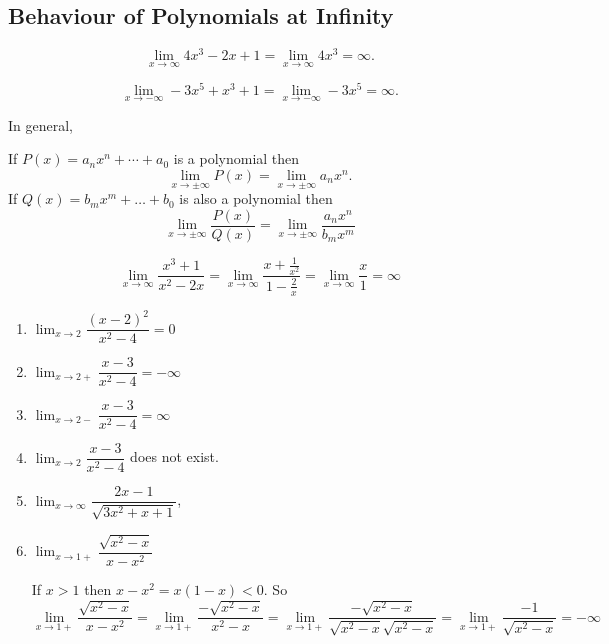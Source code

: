 \documentclass[../calc1-main.tex]{subfiles}
\begin{document}
  \subsection*{Behaviour of Polynomials at Infinity}
  \begin{example}
    \[
      \lim_{x \to \infty} 4x^3 - 2x + 1 =
      \lim_{x \to \infty} 4x^3 = \infty.
    \]

    \[
      \lim_{x \to -\infty} -3x^5 + x^3 +1 =
      \lim_{x \to -\infty} -3 x^5 = \infty.
    \]
  \end{example}
  In general,
  \begin{theorem}
    If $P(x) = a_n x^n + \cdots + a_0$ is a polynomial then
    \[
      \lim_{x \to \pm \infty} P(x) = \lim_{x \to \pm \infty} a_n x^n.
    \]
    If $Q(x) = b_m x^m + \dots + b_0$ is also a polynomial then
    \[
      \lim_{x \to \pm \infty} \frac{P(x)}{Q(x)}= \lim_{x \to \pm \infty} \frac{a_n x^n}{b_m x^m}
    \]
  \end{theorem}

  \begin{example}
    \[
      \lim_{x \to \infty} \frac{x^3+1}{x^2-2x} =
      \lim_{x \to \infty} \frac{x+\frac{1}{x^2}}{1-\frac{2}{x}} = \lim_{x \to \infty} \frac{x}{1} = \infty
    \]
  \end{example}

  \begin{example}
    \begin{enumerate}
      \item $\lim_{x \to 2} \dfrac{(x-2)^2}{x^2-4} = 0$
      \item $\lim_{x \to 2+} \dfrac{x-3}{x^2-4} = -\infty$
      \item $\lim_{x \to 2-} \dfrac{x-3}{x^2-4} = \infty$
      \item $\lim_{x \to 2} \dfrac{x-3}{x^2-4}$ does not exist.
      \item $\lim_{x \to \infty} \dfrac{2x-1}{\sqrt{3x^2+x+1}}$,
      \item $\lim_{x \to 1+} \dfrac{\sqrt{x^2-x}}{x-x^2}$
      \begin{solution}
        If $x>1$ then $x-x^2 = x(1-x) < 0$. So
        \[
          \lim_{x \to 1+} \dfrac{\sqrt{x^2-x}}{x-x^2} =
          \lim_{x \to 1+} \dfrac{-\sqrt{x^2-x}}{x^2-x} =
          \lim_{x \to 1+} \dfrac{-\sqrt{x^2-x}}{\sqrt{x^2-x} \sqrt{x^2-x}} =
          \lim_{x \to 1+} \dfrac{-1}{\sqrt{x^2-x}} = -\infty
        \]
      \end{solution}
    \end{enumerate}
  \end{example}
\end{document}
